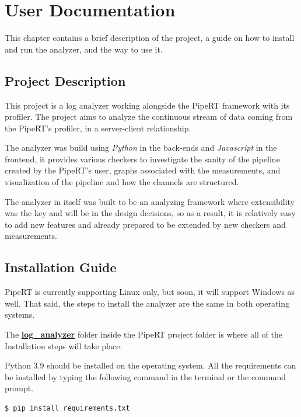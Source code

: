 \chapter{User Documentation} %
\label{ch:user}

This chapter contains a brief description of the project, a guide on how
to install and run the analyzer, and the way to use it.

\section{Project Description} %
This project is a log analyzer working alongside the PipeRT framework
with its profiler. The project aims to analyze the continuous stream of
data coming from the PipeRT's profiler, in a server-client relationship.

The analyzer was build using \textit{Python} in the back-ends and \textit{Javascript} in the frontend,
it provides various checkers to investigate the sanity of the pipeline created 
by the PipeRT's user, graphs associated with the measurements, and visualization
of the pipeline and how the channels are structured.

The analyzer in itself was built to be an analyzing framework where
extensibility was the key and will be in the design decisions, so as a result,
it is relatively easy to add new features and already prepared to be extended
by new checkers and measurements.


\section{Installation Guide}\label{sec:installiation_guide}
PipeRT is currently supporting Linux only, but soon,
it will support Windows as well. That said, the steps to install
the analyzer are the same in both operating systems.

The \textbf{\url{log_analyzer}} folder inside the PipeRT project folder
is where all of the Installation steps will take place.

Python 3.9 should be installed on the operating system. All the
requirements can be installed by typing the following command in
the terminal or the command prompt.
\newline
\begin{lstlisting}[language=bash, caption={Install requirements},captionpos=b]
	$ pip install requirements.txt
\end{lstlisting}

